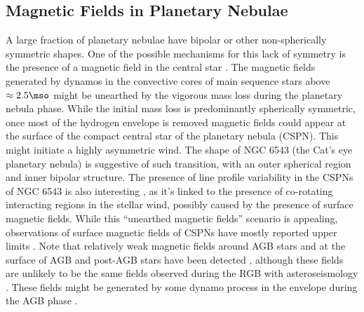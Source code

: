 \subsection{Magnetic Fields in Planetary Nebulae}
A large fraction of planetary nebulae have bipolar or other non-spherically symmetric shapes. 
One of the possible mechanisms for this lack of symmetry is the presence of a magnetic field in the central star \citep[See e.g.][]{Garc_a_Segura_1997,Chevalier_1994}. The magnetic fields generated by dynamos in the convective cores of main sequence stars above $\approx 2.5\mso$ might be unearthed by the vigorous mass loss during the planetary nebula phase. While the initial mass loss is predominantly spherically symmetric, once most of the hydrogen envelope is removed magnetic fields could appear at the surface of the compact central star of the planetary nebula (CSPN). This might initiate a highly asymmetric wind. The shape of NGC 6543 (the Cat's eye planetary nebula) is suggestive of such transition, with an outer spherical region and inner bipolar structure. The presence of line profile variability in the CSPNs of NGC 6543 is also interesting \cite{Prinja_2012}, as it's linked to the presence of co-rotating interacting regions in the stellar wind, possibly caused by the presence of surface magnetic fields. While this ``unearthed magnetic fields'' scenario is appealing, observations of surface magnetic fields of CSPNs have mostly reported upper limits \citep{Jordan_2012,Leone_2014,Asensio_Ramos_2014}. Note that relatively weak  magnetic fields around AGB stars \cite{Leal_Ferreira_2013} and at the surface of AGB and post-AGB stars have been detected \cite{L_bre_2014,Sabin_2014}, although these fields are unlikely to be the same fields observed during the RGB with asteroseismology \citep{Fuller_2015}. These fields might be generated by some dynamo process in the envelope during the AGB phase \citep[e.g.][]{Nordhaus_2007}.


